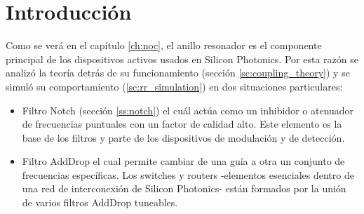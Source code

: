 \section{Introducción}
Como se verá en el capítulo \ref{ch:noc}, el anillo resonador es el componente principal 
de los dispositivos activos usados en Silicon Photonics. 
Por esta razón se analizó la teoría detrás de su funcionamiento 
(sección \ref{sc:coupling_theory}) y se simuló su comportamiento (\ref{sc:rr_simulation}) 
en dos situaciones particulares:

\begin{itemize}
\item Filtro Notch (sección \ref{ss:notch}) el cuál actúa como un inhibidor o atenuador de 
frecuencias puntuales con un factor de calidad alto. 
Este elemento es la base de los filtros y parte de los dispositivos de modulación y
de detección.

\item Filtro AddDrop el cual permite cambiar de una guía a otra un conjunto de 
frecuencias específicas. Los switches y routers 
-elementos esenciales dentro de una red de interconexión de Silicon Photonics- 
están formados por la unión de varios filtros AddDrop tuneables.

\end{itemize} 
